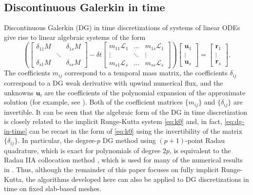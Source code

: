 \documentclass[a4paper,10pt]{article}
\begin{document}
\subsection{Discontinuous Galerkin in time}\label{sec:intro:dg}

Discontinuous Galerkin (DG) in time discretizations of systems of linear
ODEs give rise to linear algebraic systems of the form
\begin{equation} \label{eq:dg-in-time}
	\left( \begin{bmatrix}
		\delta_{11} M  & & \delta_{1s} M \\
		& \ddots \\
		\delta_{s1} M & & \delta_{ss} M
	\end{bmatrix}
	- \delta t \begin{bmatrix}
		m_{11}\mathcal{L}_1 & ... & m_{1s}\mathcal{L}_1 \\
		\vdots & \ddots & \vdots \\
		m_{s1}\mathcal{L}_s & ... & m_{ss} \mathcal{L}_s
	\end{bmatrix} \right)
		\begin{bmatrix} \mathbf{u}_1 \\ \vdots \\ \mathbf{u}_s \end{bmatrix}
		= \begin{bmatrix} \mathbf{r}_1 \\ \vdots \\ \mathbf{r}_s \end{bmatrix}.
\end{equation}
The coefficients $m_{ij}$ correspond to a temporal mass matrix, the coefficients
$\delta_{ij}$ correspond to a DG weak derivative with upwind numerical flux, and
the unknowns $\mathbf{u}_i$ are the coefficients of the polynomial expansion of
the approximate solution (for example, see \cite{hn,Akrivis2011,Lasaint1974,Makridakis2006}).
Both of the coefficient matrices $\{m_{ij}\}$ and $\{\delta_{ij}\}$ are
invertible. It can be seen that the algebraic form of the DG in time
discretization is closely related to the implicit Runge-Kutta system
\eqref{eq:k0} and, in fact, \eqref{eq:dg-in-time} can be recast in the form of
\eqref{eq:k0} using the invertibility of the matrix $\{\delta_{ij}\}$. In
particular, the degree-$p$ DG method using $(p+1)$-point
Radau quadrature, which is exact for polynomials of degree $2p$, is equivalent
to the Radau IIA collocation method \cite{Makridakis2006}, which is used for
many of the numerical results in .
Thus, although the remainder of this paper focuses on fully implicit Runge-Kutta,
the algorithms developed here can also be applied to DG discretizations in time on
fixed slab-based meshes.
\end{document}
